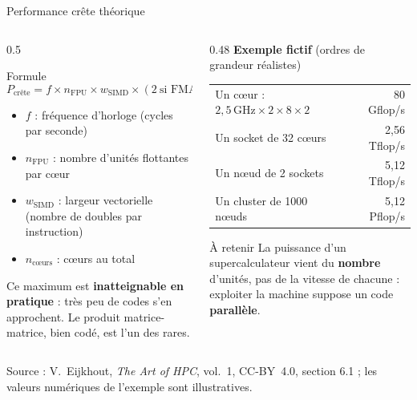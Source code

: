 \documentclass[8pt,aspectratio=169]{beamer}
\newcommand{\src}[1]{\vfill{\tiny\color{gray}Source : #1\par}}
\newcommand{\eij}{V.~Eijkhout, \emph{The Art of HPC}, vol.~1, CC-BY~4.0}
\begin{document}
\begin{frame}{Performance crête théorique}
\begin{columns}[T]
\begin{column}{0.5\textwidth}
\begin{block}{Formule}
\[
P_{\text{crête}} = f \times n_{\text{FPU}} \times w_{\text{SIMD}} \times (2\ \text{si FMA}) \times n_{\text{cœurs}}
\]
\end{block}
\begin{itemize}
\item $f$ : fréquence d'horloge (cycles par seconde)
\item $n_{\text{FPU}}$ : nombre d'unités flottantes par cœur
\item $w_{\text{SIMD}}$ : largeur vectorielle (nombre de doubles par instruction)
\item $n_{\text{cœurs}}$ : cœurs au total
\end{itemize}

\medskip
Ce maximum est \textbf{inatteignable en pratique} : très peu de codes s'en approchent. Le produit matrice-matrice, bien codé, est l'un des rares.
\end{column}
\begin{column}{0.48\textwidth}
\textbf{Exemple fictif} (ordres de grandeur réalistes)

\smallskip
\begin{tabular}{@{}lr@{}}
\toprule
Un cœur : $2{,}5\,\text{GHz} \times 2 \times 8 \times 2$ & 80 Gflop/s\\
Un socket de 32 cœurs & 2,56 Tflop/s\\
Un nœud de 2 sockets & 5,12 Tflop/s\\
Un cluster de 1000 nœuds & 5,12 Pflop/s\\
\bottomrule
\end{tabular}

\medskip
\begin{exampleblock}{À retenir}
La puissance d'un supercalculateur vient du \textbf{nombre} d'unités, pas de la vitesse de chacune : exploiter la machine suppose un code \textbf{parallèle}.
\end{exampleblock}
\end{column}
\end{columns}
\src{\eij{}, section 6.1 ; les valeurs numériques de l'exemple sont illustratives.}
\end{frame}
\end{document}
